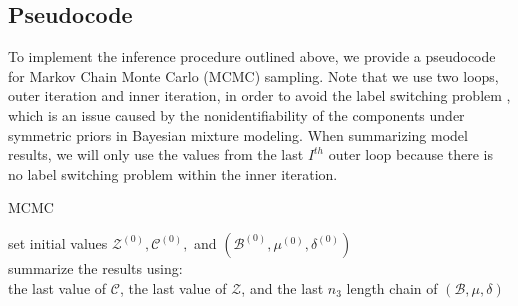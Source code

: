 \documentclass[a4paper]{article}
\begin{document}
 \subsection{Pseudocode}  \label{subsec: Pseudocode}
 To implement the inference procedure outlined above, we provide a pseudocode for Markov Chain Monte Carlo (MCMC) sampling. Note that we use two loops, outer iteration and inner iteration, in order to avoid the label switching problem \citep{jasra2005markov}, which is an issue caused by the nonidentifiability of the components under symmetric priors in Bayesian mixture modeling. When summarizing model results, we will only use the values from the last $I^{th}$ outer loop because there is no label switching problem within the inner iteration.
 \begin{algorithm}[H]
 	\SetAlgoLined
 	\caption{MCMC}
 	set initial values $\mathcal{Z}^{(0)}, \mathcal{C}^{(0)}, $ and $(\mathcal{B}^{(0)}, \mu^{(0)}, \delta^{(0)})$\\
 		summarize the results using:\\ the last value of $\mathcal{C}$, the last value of $\mathcal{Z}$, and the last $n_3$ length chain of $(\mathcal{B}, \mu, \delta)$
 \end{algorithm}
\end{document}
